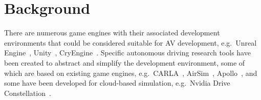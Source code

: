 \documentclass[runningheads,twocolumn,a4paper,10pt]{llncs}
\begin{document}
 
\section{Background} \label{s:background}

There are numerous game engines with their associated development environments that could be considered suitable for AV development, e.g.\ Unreal Engine~\cite{UE4_main_website}, Unity~\cite{Unity_main_website}, CryEngine~\cite{CryEngine_main_website}. Specific autonomous driving research tools have been created to abstract and simplify the development environment, some of which are based on existing game engines, e.g.\ CARLA~\cite{carla_main_website}, AirSim~\cite{AirSim_main_website}, Apollo~\cite{Apollo_main_website}, and some have been developed for cloud-based simulation, e.g.\ Nvidia Drive Constellation~\cite{nvidia_constellation}.
\end{document}
